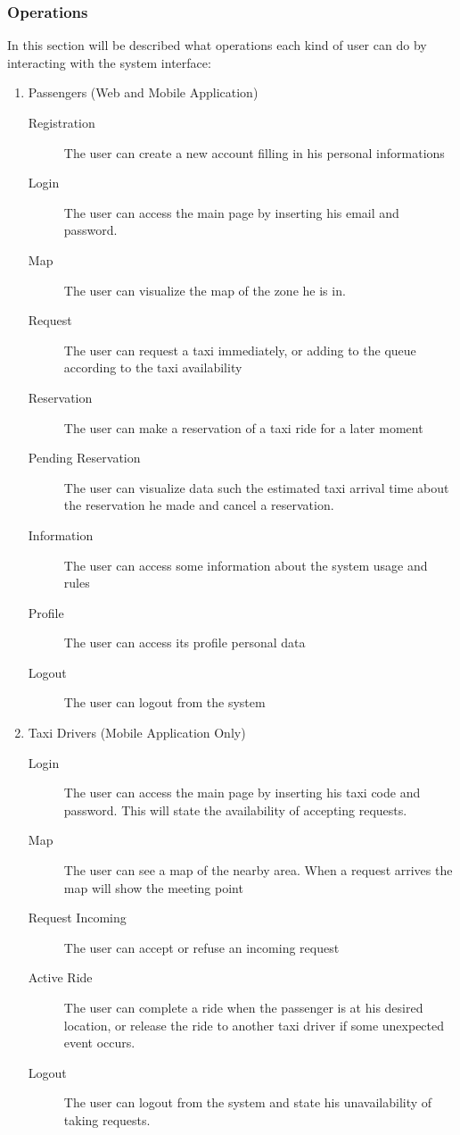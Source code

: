 \documentclass[11pt, a4paper,titlepage]{article}
\begin{document}
\subsubsection{Operations}
	In this section will be described what operations each kind of user can do by interacting with the system interface: \newline
	\begin{enumerate}
		\item Passengers (Web and Mobile Application)
			\begin{description}
				\item[Registration] The user can create a new account filling in his personal informations
				\item[Login] The user can access the main page by inserting his email and password.
				\item[Map] The user can visualize the map of the zone he is in.
				\item[Request] The user can request a taxi immediately, or adding to the queue according to the taxi availability
				\item[Reservation] The user can make a reservation of a taxi ride for a later moment
				\item[Pending Reservation] The user can visualize data such the estimated taxi arrival time about the reservation he made and cancel a reservation.
				\item[Information] The user can access some information about the system usage and rules
				\item[Profile] The user can access its profile personal data
				\item[Logout] The user can logout from the system
			\end{description}
			
		\item Taxi Drivers (Mobile Application Only)
			\begin{description}
				\item[Login] The user can access the main page by inserting his taxi code and password. This will state the availability of accepting requests.
				\item[Map] The user can see a map of the nearby area. When a request arrives the map will show the meeting point
				\item[Request Incoming] The user can accept or refuse an incoming request
				\item[Active Ride] The user can complete a ride when the passenger is at his desired location, or release the ride to another taxi driver if some unexpected event occurs.
				\item[Logout] The user can logout from the system and state his unavailability of taking requests.
			\end{description}
	

\end{enumerate}
\end{document}
